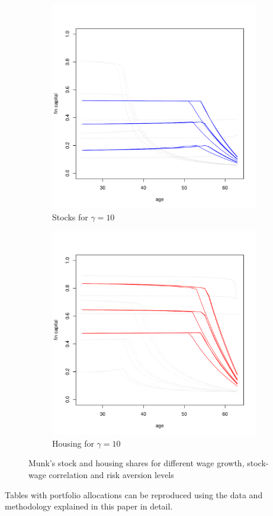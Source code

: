 \begin{figure}[H]\ContinuedFloat
    \begin{subfigure}{0.45\textwidth}
		\centering
		\includegraphics[scale=0.3]{figs/smunkhouse10.pdf}
		\caption{Stocks for $\gamma = 10$}
	\end{subfigure}
	\hfill
    \begin{subfigure}{0.45\textwidth}
		\centering
		\includegraphics[scale=0.3]{figs/hmunkhouse10.pdf}
		\caption{Housing for $\gamma = 10$}
	\end{subfigure}
	\caption{Munk's stock and housing shares for different wage growth, stock-wage correlation and risk aversion levels}
	\label{fig:munkh}
\end{figure}

Tables with portfolio allocations can be reproduced using the data and methodology explained in this paper in detail.


